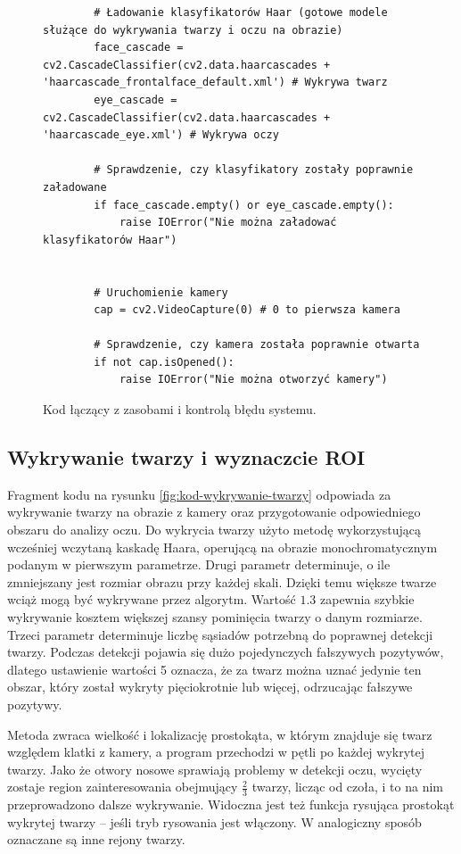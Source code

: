 \documentclass[a4paper,twoside,12pt]{book}
\begin{document}
\begin{figure}[htbp]
	\centering
	\begin{lstlisting}
		# Ładowanie klasyfikatorów Haar (gotowe modele służące do wykrywania twarzy i oczu na obrazie)
		face_cascade = cv2.CascadeClassifier(cv2.data.haarcascades + 'haarcascade_frontalface_default.xml') # Wykrywa twarz
		eye_cascade = cv2.CascadeClassifier(cv2.data.haarcascades + 'haarcascade_eye.xml') # Wykrywa oczy
		
		# Sprawdzenie, czy klasyfikatory zostały poprawnie załadowane
		if face_cascade.empty() or eye_cascade.empty():
			raise IOError("Nie można załadować klasyfikatorów Haar")
		
		
		# Uruchomienie kamery
		cap = cv2.VideoCapture(0) # 0 to pierwsza kamera
		
		# Sprawdzenie, czy kamera została poprawnie otwarta
		if not cap.isOpened():
			raise IOError("Nie można otworzyć kamery")
	\end{lstlisting}
\caption{Kod łączący z zasobami i kontrolą błędu systemu.}
\label{fig:kod-kontrola-bledow}
\end{figure}

\subsection{Wykrywanie twarzy i wyznaczcie ROI}
\label{subsec:Wykrywanie-twarzy-i-wyznaczcie-ROI}

Fragment kodu na rysunku \ref{fig:kod-wykrywanie-twarzy} odpowiada za wykrywanie twarzy na obrazie z kamery oraz przygotowanie odpowiedniego obszaru do analizy oczu. Do wykrycia twarzy użyto metodę wykorzystującą wcześniej wczytaną kaskadę Haara, operującą na obrazie monochromatycznym podanym w pierwszym parametrze. Drugi parametr determinuje, o ile zmniejszany jest rozmiar obrazu przy każdej skali. Dzięki temu większe twarze wciąż mogą być wykrywane przez algorytm. Wartość $1.3$ zapewnia szybkie wykrywanie kosztem większej szansy pominięcia twarzy o danym rozmiarze. Trzeci parametr determinuje liczbę sąsiadów potrzebną do poprawnej detekcji twarzy. Podczas detekcji pojawia się dużo pojedynczych fałszywych pozytywów, dlatego ustawienie wartości 5 oznacza, że za twarz można uznać jedynie ten obszar, który został wykryty pięciokrotnie lub więcej, odrzucając fałszywe pozytywy.

Metoda zwraca wielkość i lokalizację prostokąta, w którym znajduje się twarz względem klatki z kamery, a program przechodzi w pętli po każdej wykrytej twarzy. Jako że otwory nosowe sprawiają problemy w detekcji oczu, wycięty zostaje region zainteresowania obejmujący $\frac{2}{3}$ twarzy, licząc od czoła, i to na nim przeprowadzono dalsze wykrywanie. Widoczna jest też funkcja rysująca prostokąt wykrytej twarzy -- jeśli tryb rysowania jest włączony. W analogiczny sposób oznaczane są inne rejony twarzy.
\end{document}
